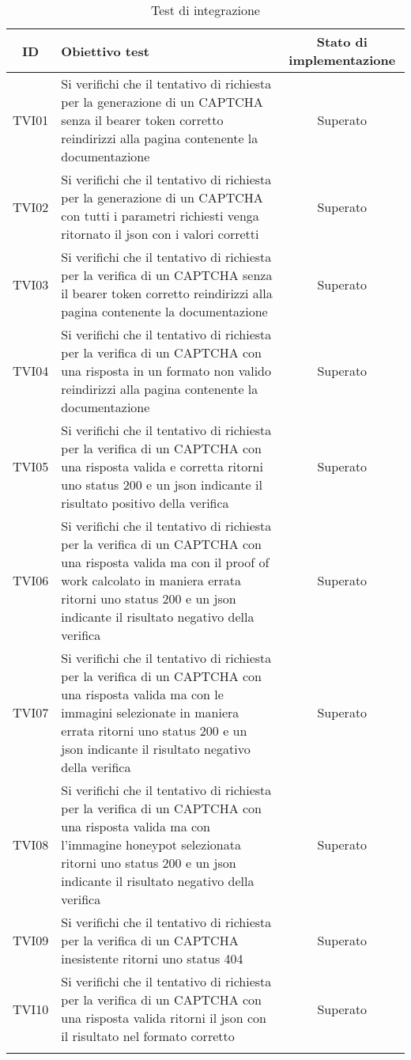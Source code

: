 \begin{center}
	\setlength\extrarowheight{5pt}
	\begin{xltabular}{\textwidth}{|c|X|c|}
		\hline
		\textbf{ID} & \textbf{Obiettivo test} & \textbf{Stato di implementazione} \\
		\hline
		TVI01 & Si verifichi che il tentativo di richiesta per la generazione di un CAPTCHA senza il bearer token corretto reindirizzi alla pagina contenente la documentazione & Superato\\
		\hline
		TVI02 & Si verifichi che il tentativo di richiesta per la generazione di un CAPTCHA con tutti i parametri richiesti venga ritornato il json con i valori corretti & Superato\\
		\hline
		TVI03 & Si verifichi che il tentativo di richiesta per la verifica di un CAPTCHA senza il bearer token corretto reindirizzi alla pagina contenente la documentazione & Superato\\
		\hline
		TVI04 & Si verifichi che il tentativo di richiesta per la verifica di un CAPTCHA con una risposta in un formato non valido reindirizzi alla pagina contenente la documentazione & Superato\\
		\hline
		TVI05 & Si verifichi che il tentativo di richiesta per la verifica di un CAPTCHA con una risposta valida e corretta ritorni uno status 200 e un json indicante il risultato positivo della verifica & Superato\\
		\hline
		TVI06 & Si verifichi che il tentativo di richiesta per la verifica di un CAPTCHA con una risposta valida ma con il proof of work calcolato in maniera errata ritorni uno status 200 e un json indicante il risultato negativo della verifica & Superato\\
		\hline
		TVI07 & Si verifichi che il tentativo di richiesta per la verifica di un CAPTCHA con una risposta valida ma con le immagini selezionate in maniera errata ritorni uno status 200 e un json indicante il risultato negativo della verifica & Superato\\
		\hline
		TVI08 & Si verifichi che il tentativo di richiesta per la verifica di un CAPTCHA con una risposta valida ma con l'immagine honeypot selezionata ritorni uno status 200 e un json indicante il risultato negativo della verifica & Superato\\
		\hline
		TVI09 & Si verifichi che il tentativo di richiesta per la verifica di un CAPTCHA inesistente ritorni uno status 404 & Superato\\
		\hline
		TVI10 & Si verifichi che il tentativo di richiesta per la verifica di un CAPTCHA con una risposta valida ritorni il json con il risultato nel formato corretto & Superato\\
		\hline
		\caption{Test di integrazione}
	\end{xltabular}
\end{center}

